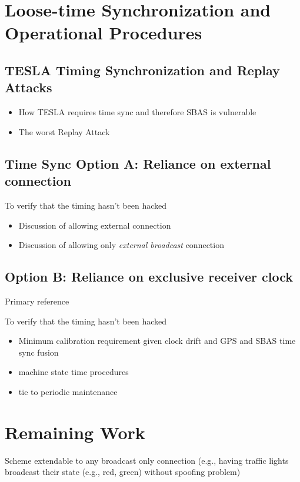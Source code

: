 \documentclass[letterpaper,times]{IONconf/IONconf}
\begin{document}
\section{Loose-time Synchronization and Operational Procedures}

\subsection{TESLA Timing Synchronization and Replay Attacks}
\begin{itemize}
	\item How TESLA requires time sync and therefore SBAS is vulnerable
	\item The worst Replay Attack
\end{itemize}

\subsection{Time Sync Option A: Reliance on external connection}

To verify that the timing hasn't been hacked
\begin{itemize}
	\item Discussion of allowing external connection
	\item Discussion of allowing only {\em external broadcast} connection
\end{itemize}

\subsection{Option B: Reliance on exclusive receiver clock}

Primary reference \cite{time_sync_paper}

To verify that the timing hasn't been hacked
\begin{itemize}
	\item Minimum calibration requirement given clock drift and GPS and SBAS time sync fusion
	\item machine state time procedures
	\item tie to periodic maintenance
\end{itemize}

\section{Remaining Work}

Scheme extendable to any broadcast only connection (e.g., having traffic lights broadcast their state (e.g., red, green) without spoofing problem)
\end{document}
